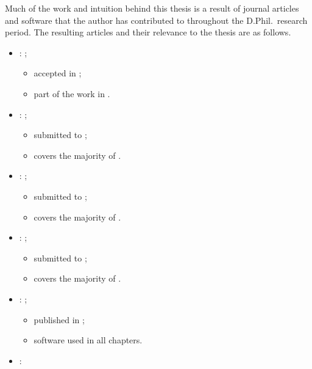 \documentclass[main.tex]{subfiles}
\begin{document}
Much of the work and intuition behind this thesis is a result of
journal articles and software that the author has contributed to
throughout the D.Phil.\ research period.
The resulting articles and their relevance to the thesis are as follows.
\begin{itemize}
\item \citet{riseth2018erratum}:
  \textit{};
  \begin{itemize}
  \item accepted in \textit{};
  \item part of the work in .
  \end{itemize}
\item \citet{riseth2017comparison}:
  \textit{};
  \begin{itemize}
  \item submitted to
    \textit{};
  \item covers the majority of .
  \end{itemize}
\item \citet{riseth2017dynamic}:
  \textit{};
  \begin{itemize}
  \item submitted to
    \textit{};
  \item covers the majority of .
  \end{itemize}
\item \citet{riseth2017objective}:
  \textit{};
  \begin{itemize}
  \item submitted to
    \textit{};
  \item covers the majority of .
  \end{itemize}
\item \citet{mogensen2018optim}:
  \textit{};
  \begin{itemize}
  \item published in
    \textit{};
  \item software used in all chapters.
  \end{itemize}
\item \citet{riseth2017operator}:

\end{itemize}
\end{document}
